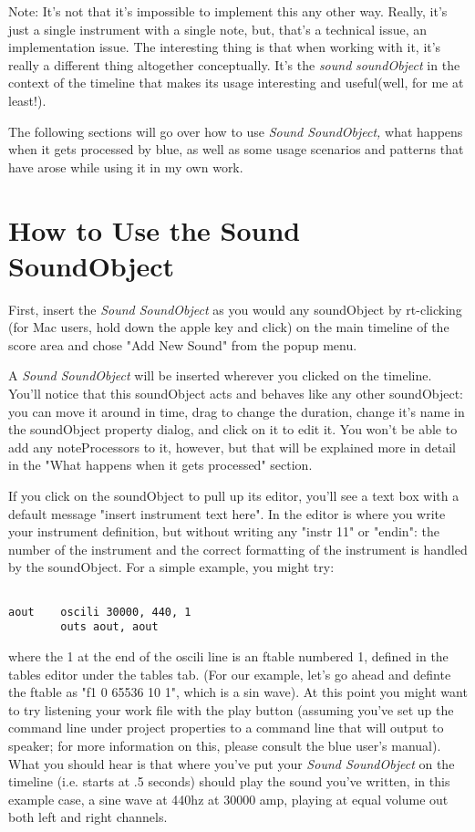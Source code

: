 Note: It's not that it's impossible to implement this any other way.
Really, it's just a single instrument with a single note, but, that's a
technical issue, an implementation issue. The interesting thing is that
when working with it, it's really a different thing altogether
conceptually. It's the \emph{sound} \emph{soundObject} in the context of
the timeline that makes its usage interesting and useful(well, for me at
least!).

The following sections will go over how to use \emph{Sound SoundObject,}
what happens when it gets processed by blue, as well as some usage
scenarios and patterns that have arose while using it in my own work.

\section{How to Use the Sound SoundObject}

First, insert the \emph{Sound SoundObject} as you would any soundObject
by rt-clicking (for Mac users, hold down the apple key and click) on the
main timeline of the score area and chose "Add New Sound" from the popup
menu.

A \emph{Sound SoundObject} will be inserted wherever you clicked on the
timeline. You'll notice that this soundObject acts and behaves like any
other soundObject: you can move it around in time, drag to change the
duration, change it's name in the soundObject property dialog, and click
on it to edit it. You won't be able to add any noteProcessors to it,
however, but that will be explained more in detail in the "What happens
when it gets processed" section.

If you click on the soundObject to pull up its editor, you'll see a text
box with a default message "insert instrument text here". In the editor
is where you write your instrument definition, but without writing any
"instr 11" or "endin": the number of the instrument and the correct
formatting of the instrument is handled by the soundObject. For a simple
example, you might try:

\begin{verbatim}
 
aout    oscili 30000, 440, 1
        outs aout, aout
\end{verbatim}

where the 1 at the end of the oscili line is an ftable numbered 1,
defined in the tables editor under the tables tab. (For our example,
let's go ahead and definte the ftable as "f1 0 65536 10 1", which is a
sin wave). At this point you might want to try listening your work file
with the play button (assuming you've set up the command line under
project properties to a command line that will output to speaker; for
more information on this, please consult the blue user's manual). What
you should hear is that where you've put your \emph{Sound SoundObject}
on the timeline (i.e. starts at .5 seconds) should play the sound you've
written, in this example case, a sine wave at 440hz at 30000 amp,
playing at equal volume out both left and right channels.

